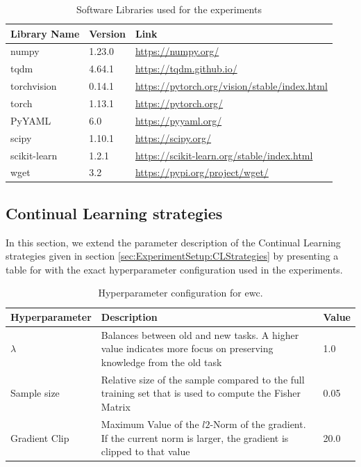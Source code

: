 \begin{table}[!htb]
    \centering
    \begin{tabular}{|l || l | l |} 
        \hline
        Library Name & Version & Link \\ 
        \hline 
        \hline
        numpy & 1.23.0 & \url{https://numpy.org/} \\
        \hline
        tqdm & 4.64.1 & \url{https://tqdm.github.io/}  \\
        \hline
        torchvision & 0.14.1 & \url{https://pytorch.org/vision/stable/index.html} \\ 
        \hline
        torch & 1.13.1 & \url{https://pytorch.org/} \\
        \hline
        PyYAML & 6.0 & \url{https://pyyaml.org/} \\
        \hline
        scipy & 1.10.1 & \url{https://scipy.org/} \\
        \hline
        scikit-learn & 1.2.1 & \url{https://scikit-learn.org/stable/index.html} \\
        \hline
        wget & 3.2 & \url{https://pypi.org/project/wget/} \\
        \hline
    \end{tabular}
    \caption{Software Libraries used for the experiments}
    \label{fig:Libraries}
\end{table}

\subsection{Continual Learning strategies}
\label{sec:Appendix:CLStrategies}
In this section, we extend the parameter description of the Continual Learning strategies given in section 
\ref{sec:ExperimentSetup:CLStrategies} by presenting a table for with the exact hyperparameter configuration
used in the experiments.

\begin{table}[!htb]
    \begin{tabularx}{\textwidth}{|l | X | l |} 
        \hline
        Hyperparameter & Description & Value \\ 
        \hline 
        \hline
        $\lambda$ & Balances between old and new tasks. A higher value indicates more focus 
        on preserving knowledge from the old task & 1.0  \\ 
        \hline
        Sample size & Relative size of the sample compared to the full training set that is used to 
        compute the Fisher Matrix & 0.05  \\ 
        \hline
        Gradient Clip & Maximum Value of the $l2$-Norm of the gradient. If the current norm is larger,
        the gradient is clipped to that value & 20.0 \\ 
        \hline
    \end{tabularx}
    \caption{Hyperparameter configuration for \gls{ewc}.}
    \label{fig:EWCparams}
\end{table}

